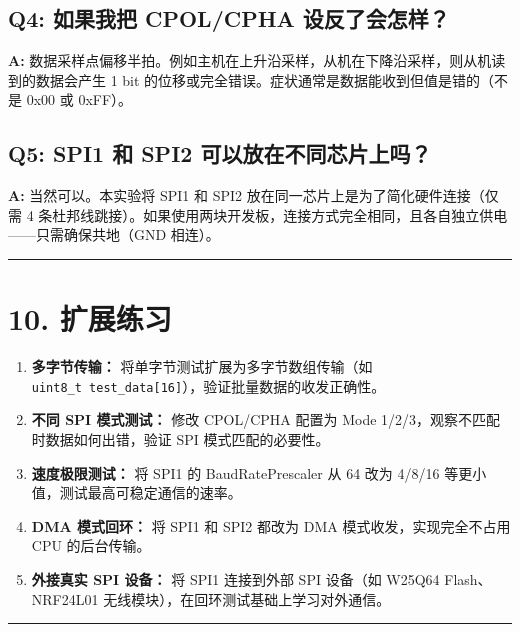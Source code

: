 \documentclass[
  chinese,
  UTF8,
  oneside,
  openany]{ctexbook}
\begin{document}
\subsection{Q4: 如果我把 CPOL/CPHA
设反了会怎样？}\label{q4-ux5982ux679cux6211ux628a-cpolcpha-ux8bbeux53cdux4e86ux4f1aux600eux6837}

\textbf{A:}
数据采样点偏移半拍。例如主机在上升沿采样，从机在下降沿采样，则从机读到的数据会产生
1 bit 的位移或完全错误。症状通常是数据能收到但值是错的（不是 0x00 或
0xFF）。

\subsection{Q5: SPI1 和 SPI2
可以放在不同芯片上吗？}\label{q5-spi1-ux548c-spi2-ux53efux4ee5ux653eux5728ux4e0dux540cux82afux7247ux4e0aux5417}

\textbf{A:} 当然可以。本实验将 SPI1 和 SPI2
放在同一芯片上是为了简化硬件连接（仅需 4
条杜邦线跳接）。如果使用两块开发板，连接方式完全相同，且各自独立供电------只需确保共地（GND
相连）。

\begin{center}\rule{0.5\linewidth}{0.5pt}\end{center}

\section{10. 扩展练习}\label{ux6269ux5c55ux7ec3ux4e60-3}

\begin{enumerate}
\def\labelenumi{\arabic{enumi}.}
\item
  \textbf{多字节传输：} 将单字节测试扩展为多字节数组传输（如
  \texttt{uint8\_t\ test\_data{[}16{]}}），验证批量数据的收发正确性。
\item
  \textbf{不同 SPI 模式测试：} 修改 CPOL/CPHA 配置为 Mode
  1/2/3，观察不匹配时数据如何出错，验证 SPI 模式匹配的必要性。
\item
  \textbf{速度极限测试：} 将 SPI1 的 BaudRatePrescaler 从 64 改为 4/8/16
  等更小值，测试最高可稳定通信的速率。
\item
  \textbf{DMA 模式回环：} 将 SPI1 和 SPI2 都改为 DMA
  模式收发，实现完全不占用 CPU 的后台传输。
\item
  \textbf{外接真实 SPI 设备：} 将 SPI1 连接到外部 SPI 设备（如 W25Q64
  Flash、NRF24L01 无线模块），在回环测试基础上学习对外通信。
\end{enumerate}

\begin{center}\rule{0.5\linewidth}{0.5pt}\end{center}
\end{document}
